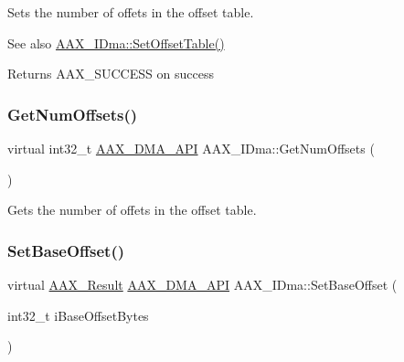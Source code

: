 Sets the number of offets in the offset table. 

\begin{DoxySeeAlso}{See also}
\mbox{\hyperlink{a01809_a9a106088088a8fc812b137bd90c0fa3a}{A\+A\+X\+\_\+\+I\+Dma\+::\+Set\+Offset\+Table()}}
\end{DoxySeeAlso}
\begin{DoxyReturn}{Returns}
{\ttfamily A\+A\+X\+\_\+\+S\+U\+C\+C\+E\+SS} on success 
\end{DoxyReturn}
\mbox{\label{a01809_a582df429c4f543d66d63c87e2ea3a1e2}} 
\subsubsection{\texorpdfstring{GetNumOffsets()}{GetNumOffsets()}}
{\footnotesize\ttfamily virtual int32\+\_\+t \mbox{\hyperlink{a00587_acae60d01e5e4bd3282369d0d9d378f3f}{A\+A\+X\+\_\+\+D\+M\+A\+\_\+\+A\+PI}} A\+A\+X\+\_\+\+I\+Dma\+::\+Get\+Num\+Offsets (\begin{DoxyParamCaption}{ }\end{DoxyParamCaption})\hspace{0.3cm}{\ttfamily [pure virtual]}}



Gets the number of offets in the offset table. 

\mbox{\label{a01809_ac3a22df0462c7f4888a429b3eadae4dd}} 
\subsubsection{\texorpdfstring{SetBaseOffset()}{SetBaseOffset()}}
{\footnotesize\ttfamily virtual \mbox{\hyperlink{a00392_a4d8f69a697df7f70c3a8e9b8ee130d2f}{A\+A\+X\+\_\+\+Result}} \mbox{\hyperlink{a00587_acae60d01e5e4bd3282369d0d9d378f3f}{A\+A\+X\+\_\+\+D\+M\+A\+\_\+\+A\+PI}} A\+A\+X\+\_\+\+I\+Dma\+::\+Set\+Base\+Offset (\begin{DoxyParamCaption}\item[{int32\+\_\+t}]{i\+Base\+Offset\+Bytes }\end{DoxyParamCaption})\hspace{0.3cm}{\ttfamily [pure virtual]}}



